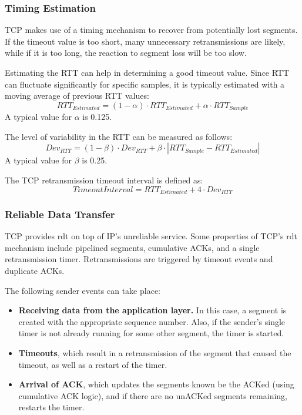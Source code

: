 \documentclass[12pt,titlepage]{article}
\begin{document}
      \subsubsection{Timing Estimation}
        TCP makes use of a timing mechanism to recover from potentially lost segments. If the timeout value is too short, many unnecessary retransmissions are likely, while if it is
        too long, the reaction to segment loss will be too slow.

        Estimating the RTT can help in determining a good timeout value. Since RTT can fluctuate significantly for specific samples, it is typically estimated with a moving average of
        previous RTT values:
        $$RTT_{Estimated} = (1 - \alpha) \cdot RTT_{Estimated} + \alpha \cdot RTT_{Sample}$$
        A typical value for $\alpha$ is 0.125.

        The level of variability in the RTT can be measured as follows:
        $$Dev_{RTT} = (1 - \beta) \cdot Dev_{RTT} + \beta \cdot |RTT_{Sample} - RTT_{Estimated}|$$
        A typical value for $\beta$ is 0.25.

        The TCP retransmission timeout interval is defined as:
        $$TimeoutInterval = RTT_{Estimated} + 4 \cdot Dev_{RTT}$$

      \subsubsection{Reliable Data Transfer}
        TCP provides rdt on top of IP's unreliable service. Some properties of TCP's rdt mechanism include pipelined segments, cumulative ACKs, and a single retransmission timer.
        Retransmissions are triggered by timeout events and duplicate ACKs.

        The following sender events can take place:
        \begin{itemize}
          \item \textbf{Receiving data from the application layer.} In this case, a segment is created with the appropriate sequence number. Also, if the sender's single timer is not
            already running for some other segment, the timer is started.
          \item \textbf{Timeouts}, which result in a retransmission of the segment that caused the timeout, as well as a restart of the timer.
          \item \textbf{Arrival of ACK}, which updates the segments known be the ACKed (using cumulative ACK logic), and if there are no unACKed segments remaining, restarts the timer.
        \end{itemize}
\end{document}

